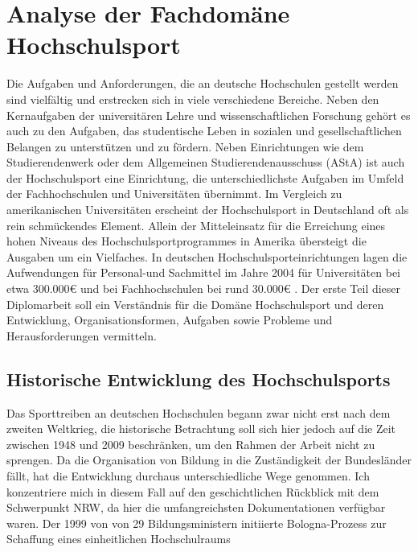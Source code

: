 \chapter{Analyse der Fachdomäne Hochschulsport} 
\label{ch:hochschulsport} 
Die Aufgaben und Anforderungen, die an deutsche Hochschulen gestellt werden sind vielfältig und erstrecken sich in viele verschiedene Bereiche. Neben den Kernaufgaben der universitären Lehre und wissenschaftlichen Forschung gehört es auch zu den Aufgaben, das studentische Leben in sozialen und gesellschaftlichen Belangen zu unterstützen und zu fördern. Neben Einrichtungen wie dem Studierendenwerk oder dem Allgemeinen Studierendenausschuss (AStA) ist auch der Hochschulsport eine Einrichtung, die unterschiedlichste Aufgaben im Umfeld der Fachhochschulen und Universitäten übernimmt. Im Vergleich zu amerikanischen Universitäten erscheint der Hochschulsport in Deutschland oft als rein schmückendes Element. Allein der Mitteleinsatz für die Erreichung eines hohen Niveaus des Hochschulsportprogrammes in Amerika übersteigt die Ausgaben um ein Vielfaches. In deutschen Hochschulsporteinrichtungen lagen die Aufwendungen für Personal-und Sachmittel im Jahre 2004 für Universitäten bei etwa 300.000€ und bei Fachhochschulen bei rund 30.000€ \cite[vgl. ][S.9]{Hachmeister.2004}. 
Der erste Teil dieser Diplomarbeit soll ein Verständnis für die Domäne Hochschulsport und deren Entwicklung, Organisationsformen, Aufgaben sowie Probleme und Herausforderungen vermitteln.

\section{Historische Entwicklung des Hochschulsports}
Das Sporttreiben an deutschen Hochschulen begann zwar nicht erst nach dem zweiten Weltkrieg, die historische Betrachtung soll sich hier jedoch auf die Zeit zwischen 1948 und 2009 beschränken, um den Rahmen der Arbeit nicht zu sprengen. Da die Organisation von Bildung in die Zuständigkeit der Bundesländer fällt, hat die Entwicklung durchaus unterschiedliche Wege genommen. Ich konzentriere mich in diesem Fall auf den geschichtlichen Rückblick mit dem Schwerpunkt NRW, da hier die umfangreichsten Dokumentationen verfügbar waren. 
Der 1999 von von 29 Bildungsministern initiierte Bologna-Prozess zur Schaffung eines einheitlichen Hochschulraums \cite*[vgl.][]{Zandonella.2005}
 
